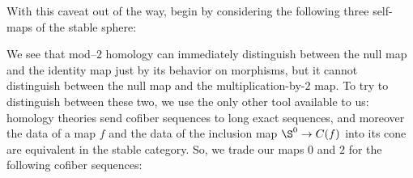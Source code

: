 With this caveat out of the way, begin by considering the following three self-maps of the stable sphere:
\begin{center}
\end{center}
We see that mod--$2$ homology can immediately distinguish between the null map and the identity map just by its behavior on morphisms, but it cannot distinguish between the null map and the multiplication-by-$2$ map.  To try to distinguish between these two, we use the only other tool available to us: homology theories send cofiber sequences to long exact sequences, and moreover the data of a map $f$ and the data of the inclusion map $\S^0 \to C(f)$ into its cone are equivalent in the stable category.  So, we trade our maps $0$ and $2$ for the following cofiber sequences:
